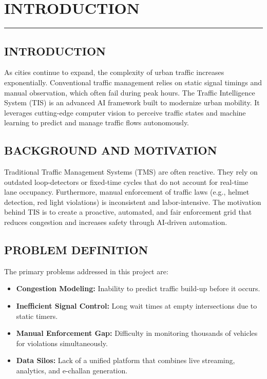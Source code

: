\documentclass[12pt,times,a4paper]{report}
\newcommand\HRule{\rule{\textwidth}{1pt}}
\begin{document}
\chapter{INTRODUCTION}
\HRule
\section{INTRODUCTION}
As cities continue to expand, the complexity of urban traffic increases exponentially. Conventional traffic management relies on static signal timings and manual observation, which often fail during peak hours. The Traffic Intelligence System (TIS) is an advanced AI framework built to modernize urban mobility. It leverages cutting-edge computer vision to perceive traffic states and machine learning to predict and manage traffic flows autonomously.

\section{BACKGROUND AND MOTIVATION}
Traditional Traffic Management Systems (TMS) are often reactive. They rely on outdated loop-detectors or fixed-time cycles that do not account for real-time lane occupancy. Furthermore, manual enforcement of traffic laws (e.g., helmet detection, red light violations) is inconsistent and labor-intensive. The motivation behind TIS is to create a proactive, automated, and fair enforcement grid that reduces congestion and increases safety through AI-driven automation.

\section{PROBLEM DEFINITION}
The primary problems addressed in this project are:
\begin{itemize}
    \item \textbf{Congestion Modeling:} Inability to predict traffic build-up before it occurs.
    \item \textbf{Inefficient Signal Control:} Long wait times at empty intersections due to static timers.
    \item \textbf{Manual Enforcement Gap:} Difficulty in monitoring thousands of vehicles for violations simultaneously.
    \item \textbf{Data Silos:} Lack of a unified platform that combines live streaming, analytics, and e-challan generation.
\end{itemize}
\end{document}
